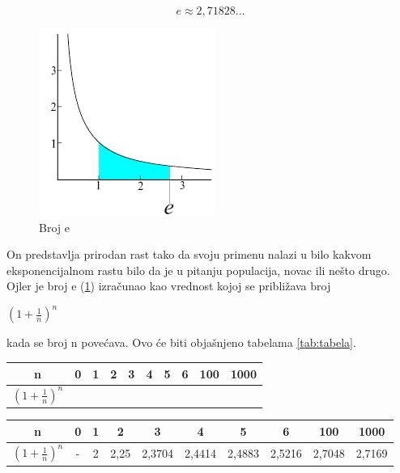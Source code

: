 \documentclass{article}
\begin{document}
	
	\begingroup
	\centering
	\[ e\approx 2,71828...\]
	\endgroup
	\vspace{5mm}
	
	\begin{figure}
		\includegraphics[scale = 0.5]{1.png}
		\caption{Broj e}
		\label{fig:br}
	\end{figure}
	On predstavlja prirodan rast tako da svoju primenu nalazi u bilo kakvom eksponencijalnom rastu bilo da je u pitanju populacija, novac ili nešto drugo. Ojler je broj e (\ref{fig:br}) izračunao kao vrednost kojoj se približava broj
	\newline
	
	\begingroup
	\centering
	
	$( 1 + \frac{1}{n} )^n$
	
	\endgroup 
	\vspace{5mm}
	
	kada se broj n povećava. Ovo će biti objašnjeno tabelama \ref{tab:tabela}. 
	\vspace{3cm}
	
	\begin{center}

           
		\begin{tabular}{|c|c|c|c|c|c|c|c|c|c|}
			\hline 
			n & 0 & 1 & 2 & 3 & 4 & 5 & 6 & 100 & 1000 \\
			\hline
			$( 1 + \frac{1}{n} )^n$ &   &   &   &   &   &   &   &   &   \\
			\hline

		\end{tabular}
          \label{tab:tabela}
	\end{center}
	
	
	\begin{center}
		\begin{tabular}{|c|c|c|c|c|c|c|c|c|c|}
			\hline 
			n & 0 & 1 & 2 & 3 & 4 & 5 & 6 & 100 & 1000 \\
			\hline
			$( 1 + \frac{1}{n} )^n$ & - & 2 & 2,25 & 2,3704 & 2,4414 & 2,4883 & 2,5216 & 2,7048 & 2,7169 \\
			\hline
   
		\end{tabular}
	\end{center}
\vspace{5mm}
\end{document}
